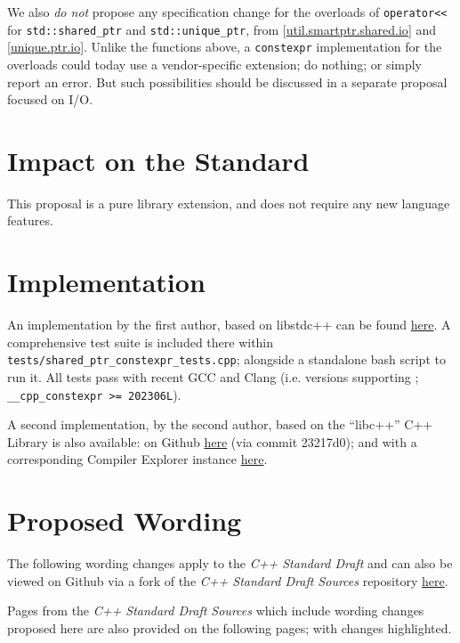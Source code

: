 \documentclass[10pt]{article}
\newcommand*{\wgxxi}[1]{[\href{https://wg21.link/#1}{#1}]}
\newcommand*{\upstreamcommit}{4dd513d}
\newcommand*{\forkcommit}{4b5d3cf}
\begin{document}
We also \emph{do not} propose any specification change for the overloads of
\texttt{operator<<} for \texttt{std::shared\_ptr} and
\texttt{std::unique\_ptr}, from \wgxxi{util.smartptr.shared.io} and
\wgxxi{unique.ptr.io}. Unlike the functions above, a \texttt{constexpr}
implementation for the overloads could today use a vendor-specific extension;
do nothing; or simply report an error. But such possibilities should be
discussed in a separate proposal focused on I/O.

\section{Impact on the Standard}

This proposal is a pure library extension, and does not require any new
language features.

\section{Implementation}

An implementation by the first author, based on libstdc++
can be found \href{https://github.com/SCT4SP/constexpr_shared_ptr}{here}. A
comprehensive test suite is included there within
\texttt{tests/shared\_ptr\_constexpr\_tests.cpp}; alongside a standalone bash
script to run it. All tests pass with recent GCC and Clang (i.e. versions
supporting \cite{P2738R1}; \texttt{\_\_cpp\_constexpr >= 202306L}).

A second implementation, by the second author, based on the ``libc++'' C++
Library is also available: on Github
\href{https://github.com/hanickadot/llvm-project/tree/P3309-constexpr-atomic-and-atomic-ref}{here}
(via commit 23217d0); and with a corresponding Compiler Explorer instance
\href{https://compiler-explorer.com/z/8cj7nc1no}{here}.

\section{Proposed Wording}
\label{sec:wording}

The following wording changes apply to the \emph{C++ Standard Draft} and can
also be viewed on Github via a fork of the \emph{C++ Standard Draft Sources}
repository
\href{https://github.com/cplusplus/draft/compare/\upstreamcommit...pkeir:draft:\forkcommit}{here}.

Pages from the \emph{C++ Standard Draft Sources} which include wording changes
proposed here are also provided on the following pages; with changes
highlighted.
\end{document}
